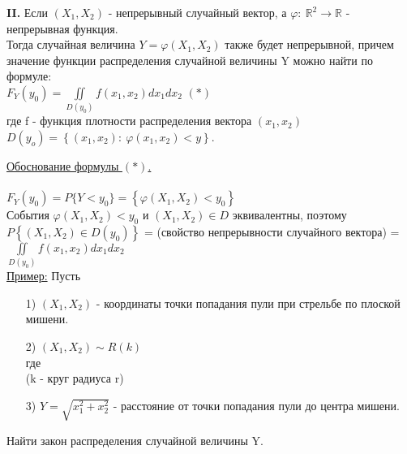 \textbf{II.} Если $(X_1, X_2)$ - непрерывный случайный вектор, а $\varphi: \ \mathbb{R}^2 \to \mathbb{R}$ - непрерывная функция. \\
Тогда случайная величина $Y = \varphi(X_1, X_2)$ также будет непрерывной, причем значение функции распределения случайной величины Y можно найти по формуле: \\
$\displaystyle  F_Y(y_0) = \iint\limits_{D(y_0)} f(x_1, x_2) dx_1 dx_2$ $(*)$ \\
где f - функция плотности распределения вектора $(x_1, x_2)$ \\
$D(y_o) = \left\{ (x_1, x_2): \ \varphi(x_1, x_2) < y \right\}$.


\underline{Обоснование формулы $(*)$.} \\
\\
$F_Y(y_0) = P\{Y < y_0\} = \left\{ \varphi(X_1, X_2) < y_0\right\}$ \fbox{=} \\
События $\varphi(X_1, X_2) < y_0$ и $(X_1, X_2) \in D$ эквивалентны, поэтому \\
\fbox{=} $P\left\{ (X_1, X_2) \in D(y_0) \right\}$ = (свойство непрерывности случайного вектора) = $\displaystyle  \iint\limits_{D(y_0)} f(x_1, x_2) dx_1 dx_2$ \\


\underline{Пример:} Пусть \\
\begin{enumerate}
	\item[1)] $(X_1, X_2)$ - координаты точки попадания пули при стрельбе по плоской мишени. 
	\item[2)] $(X_1, X_2) \sim R(k)$ \\
	где \\ %
	(k - круг радиуса r) 
	\item[3)] $Y = \sqrt{x^2_1 + x^2_2}$ - расстояние от точки попадания пули до центра мишени. 
\end{enumerate}
Найти закон распределения случайной величины Y.

